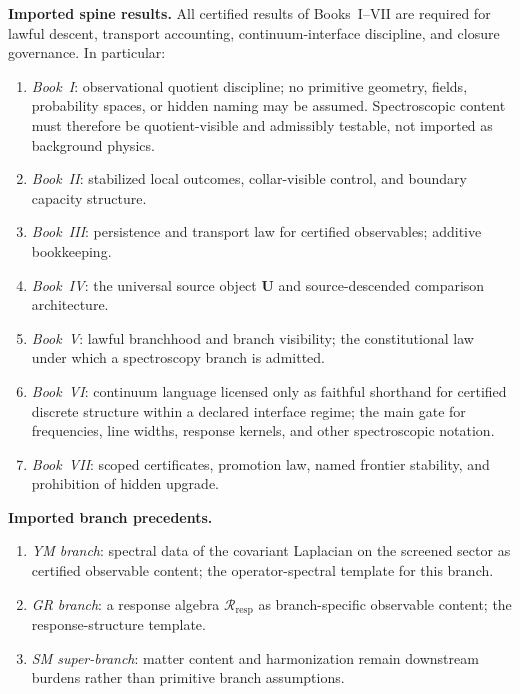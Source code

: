 \documentclass[12pt,oneside]{amsbook}
\theoremstyle{plain}
\theoremstyle{definition}
\theoremstyle{remark}
\begin{document}
\textbf{Imported spine results.} All certified results of Books~I--VII
are required for lawful descent, transport accounting, continuum-interface
discipline, and closure governance. In particular:
\begin{enumerate}[label=\textup{(\arabic*)}]
 \item \emph{Book~I}: observational quotient discipline; no primitive
 geometry, fields, probability spaces, or hidden naming may be assumed.
 Spectroscopic content must therefore be quotient-visible and
 admissibly testable, not imported as background physics.
 \item \emph{Book~II}: stabilized local outcomes, collar-visible
 control, and boundary capacity structure.
 \item \emph{Book~III}: persistence and transport law for certified
 observables; additive bookkeeping.
 \item \emph{Book~IV}: the universal source object $\mathbf{U}$ and
 source-descended comparison architecture.
 \item \emph{Book~V}: lawful branchhood and branch visibility; the
 constitutional law under which a spectroscopy branch is admitted.
 \item \emph{Book~VI}: continuum language licensed only as faithful
 shorthand for certified discrete structure within a declared interface
 regime; the main gate for frequencies, line widths, response kernels,
 and other spectroscopic notation.
 \item \emph{Book~VII}: scoped certificates, promotion law, named
 frontier stability, and prohibition of hidden upgrade.
\end{enumerate}

\textbf{Imported branch precedents.}
\begin{enumerate}[label=\textup{(\arabic*)}]
 \item \emph{YM branch}: spectral data of the covariant Laplacian on
 the screened sector as certified observable content; the operator-spectral
 template for this branch.
 \item \emph{GR branch}: a response algebra $\mathcal{R}_{\mathrm{resp}}$
 as branch-specific observable content; the response-structure template.
 \item \emph{SM super-branch}: matter content and harmonization remain
 downstream burdens rather than primitive branch assumptions.
\end{enumerate}

\end{document}
